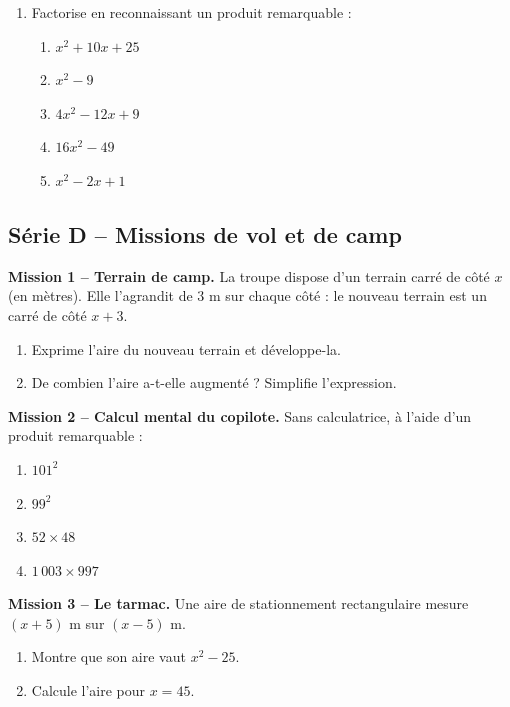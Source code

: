 \documentclass[../main.tex]{subfiles}
\begin{document}
\begin{enumerate}[label=\textbf{\arabic*.},start=3]

\item Factorise en reconnaissant un produit remarquable :
\begin{enumerate}[label=\alph*)]
  \item $x^2 + 10x + 25$ \qquad
  \item $x^2 - 9$ \qquad
  \item $4x^2 - 12x + 9$ \qquad
  \item $16x^2 - 49$ \qquad
  \item $x^2 - 2x + 1$
\end{enumerate}

\end{enumerate}

\subsection{Série D -- Missions de vol et de camp}

\textbf{Mission 1 -- Terrain de camp.}
La troupe dispose d'un terrain carré de côté $x$ (en mètres). Elle l'agrandit de $3$ m sur chaque côté : le nouveau terrain est un carré de côté $x + 3$.
\begin{enumerate}[label=\alph*)]
  \item Exprime l'aire du nouveau terrain et développe-la.
  \item De combien l'aire a-t-elle augmenté ? Simplifie l'expression.
\end{enumerate}

\textbf{Mission 2 -- Calcul mental du copilote.}
Sans calculatrice, à l'aide d'un produit remarquable :
\begin{enumerate}[label=\alph*)]
  \item $101^2$ \qquad
  \item $99^2$ \qquad
  \item $52 \times 48$ \qquad
  \item $1\,003 \times 997$
\end{enumerate}

\textbf{Mission 3 -- Le tarmac.}
Une aire de stationnement rectangulaire mesure $(x+5)$ m sur $(x-5)$ m.
\begin{enumerate}[label=\alph*)]
  \item Montre que son aire vaut $x^2 - 25$.
  \item Calcule l'aire pour $x = 45$.
\end{enumerate}
\end{document}
